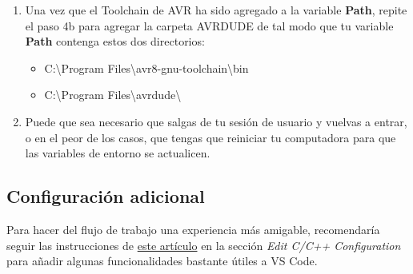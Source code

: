 \documentclass[10pt,letterpaper]{article}
\begin{document}
\begin{enumerate}
\begin{enumerate}
\begin{enumerate}
        \end{enumerate}
    \end{enumerate}
    \item Una vez que el Toolchain de AVR ha sido agregado a la variable \textbf{Path}, repite el paso 4b para agregar la carpeta AVRDUDE de tal modo que tu variable \textbf{Path} contenga estos dos directorios:
    \begin{itemize}
        \item {\color{ForestGreen}C:\textbackslash Program Files\textbackslash avr8-gnu-toolchain\textbackslash bin}
        \item {\color{ForestGreen}C:\textbackslash Program Files\textbackslash avrdude\textbackslash}
    \end{itemize}
    \item Puede que sea necesario que salgas de tu sesión de usuario y vuelvas a entrar, o en el peor de los casos, que tengas que reiniciar tu computadora para que las variables de entorno se actualicen. 
\end{enumerate}

\subsection{Configuración adicional}
Para hacer del flujo de trabajo una experiencia más amigable, recomendaría seguir las instrucciones de \href{https://www.tonymitchell.ca/posts/use-vscode-with-avr-toolchain/}{este artículo} en la sección \textit{Edit C/C++ Configuration} para añadir algunas funcionalidades bastante útiles a VS Code.
\end{document}
